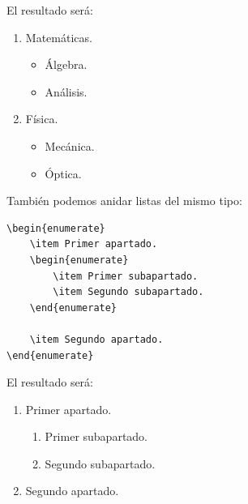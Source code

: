 \documentclass[11pt,a4paper]{article}
\theoremstyle{plain}
\theoremstyle{definition}
\theoremstyle{remark}
\theoremstyle{exercise}
\begin{document}
\noindent El resultado será:

\begin{paginarecuadrada}
\begin{enumerate}
    \item Matemáticas.
    \begin{itemize}
        \item Álgebra.
        \item Análisis.
    \end{itemize}

    \item Física.
    \begin{itemize}
        \item Mecánica.
        \item Óptica.
    \end{itemize}
\end{enumerate}
\end{paginarecuadrada}

\medskip

También podemos anidar listas del mismo tipo:

\begin{lstlisting}
\begin{enumerate}
    \item Primer apartado.
    \begin{enumerate}
        \item Primer subapartado.
        \item Segundo subapartado.
    \end{enumerate}

    \item Segundo apartado.
\end{enumerate}
\end{lstlisting}

\noindent El resultado será:

\begin{paginarecuadrada}
\begin{enumerate}
    \item Primer apartado.
    \begin{enumerate}
        \item Primer subapartado.
        \item Segundo subapartado.
    \end{enumerate}

    \item Segundo apartado.
\end{enumerate}
\end{paginarecuadrada}
\end{document}
